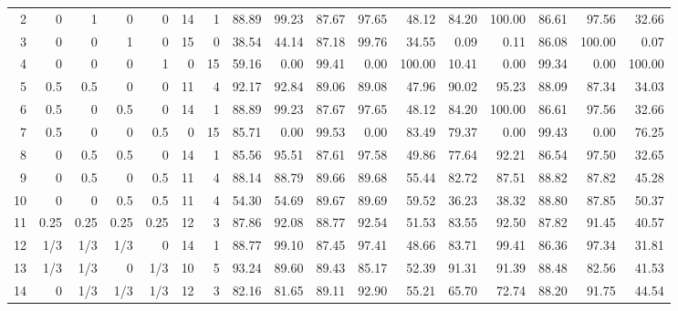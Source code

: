 \begin{landscape}
\begin{table}[p]
{\begin{tabular}{rrrrrrrrrrrrrrrrr}
2 & 0 & 1 & 0 & 0 & \multicolumn{1}{|r}{14} & 1 & \multicolumn{1}{|r}{88.89} & 99.23 & 87.67 & 97.65 & 48.12 & \multicolumn{1}{|r}{84.20} & 100.00 & 86.61 & 97.56 & 32.66 \\
3 & 0 & 0 & 1 & 0 & \multicolumn{1}{|r}{15} & 0 & \multicolumn{1}{|r}{38.54} & 44.14 & 87.18 & 99.76 & 34.55 & \multicolumn{1}{|r}{0.09} & 0.11 & 86.08 & 100.00 & 0.07 \\
4 & 0 & 0 & 0 & 1 & \multicolumn{1}{|r}{0} & 15 & \multicolumn{1}{|r}{59.16} & 0.00 & 99.41 & 0.00 & 100.00 & \multicolumn{1}{|r}{10.41} & 0.00 & 99.34 & 0.00 & 100.00 \\
5 & 0.5 & 0.5 & 0 & 0 & \multicolumn{1}{|r}{11} & 4 & \multicolumn{1}{|r}{92.17} & 92.84 & 89.06 & 89.08 & 47.96 & \multicolumn{1}{|r}{90.02} & 95.23 & 88.09 & 87.34 & 34.03 \\
6 & 0.5 & 0 & 0.5 & 0 & \multicolumn{1}{|r}{14} & 1 & \multicolumn{1}{|r}{88.89} & 99.23 & 87.67 & 97.65 & 48.12 & \multicolumn{1}{|r}{84.20} & 100.00 & 86.61 & 97.56 & 32.66 \\
7 & 0.5 & 0 & 0 & 0.5 & \multicolumn{1}{|r}{0} & 15 & \multicolumn{1}{|r}{85.71} & 0.00 & 99.53 & 0.00 & 83.49 & \multicolumn{1}{|r}{79.37} & 0.00 & 99.43 & 0.00 & 76.25 \\
8 & 0 & 0.5 & 0.5 & 0 & \multicolumn{1}{|r}{14} & 1 & \multicolumn{1}{|r}{85.56} & 95.51 & 87.61 & 97.58 & 49.86 & \multicolumn{1}{|r}{77.64} & 92.21 & 86.54 & 97.50 & 32.65 \\
9 & 0 & 0.5 & 0 & 0.5 & \multicolumn{1}{|r}{11} & 4 & \multicolumn{1}{|r}{88.14} & 88.79 & 89.66 & 89.68 & 55.44 & \multicolumn{1}{|r}{82.72} & 87.51 & 88.82 & 87.82 & 45.28 \\
10 & 0 & 0 & 0.5 & 0.5 & \multicolumn{1}{|r}{11} & 4 & \multicolumn{1}{|r}{54.30} & 54.69 & 89.67 & 89.69 & 59.52 & \multicolumn{1}{|r}{36.23} & 38.32 & 88.80 & 87.85 & 50.37 \\
11 & 0.25 & 0.25 & 0.25 & 0.25 & \multicolumn{1}{|r}{12} & 3 & \multicolumn{1}{|r}{87.86} & 92.08 & 88.77 & 92.54 & 51.53 & \multicolumn{1}{|r}{83.55} & 92.50 & 87.82 & 91.45 & 40.57 \\
12 & 1/3 & 1/3 & 1/3 & 0 & \multicolumn{1}{|r}{14} & 1 & \multicolumn{1}{|r}{88.77} & 99.10 & 87.45 & 97.41 & 48.66 & \multicolumn{1}{|r}{83.71} & 99.41 & 86.36 & 97.34 & 31.81 \\
13 & 1/3 & 1/3 & 0 & 1/3 & \multicolumn{1}{|r}{10} & 5 & \multicolumn{1}{|r}{93.24} & 89.60 & 89.43 & 85.17 & 52.39 & \multicolumn{1}{|r}{91.31} & 91.39 & 88.48 & 82.56 & 41.53 \\
14 & 0 & 1/3 & 1/3 & 1/3 & \multicolumn{1}{|r}{12} & 3 & \multicolumn{1}{|r}{82.16} & 81.65 & 89.11 & 92.90 & 55.21 & \multicolumn{1}{|r}{65.70} & 72.74 & 88.20 & 91.75 & 44.54
\end{tabular}
}
\end{table}
\end{landscape}
